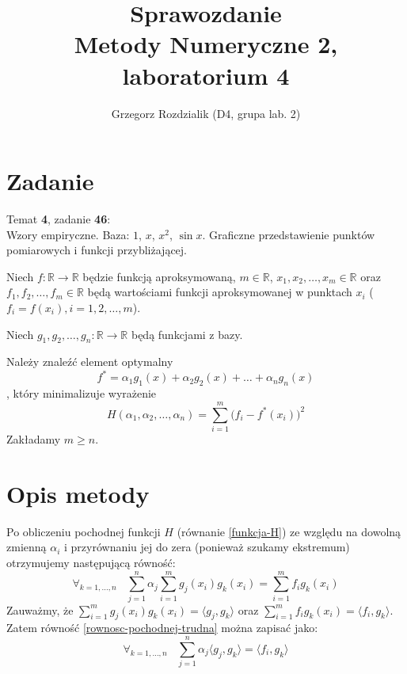 \documentclass[12pt]{article}
\begin{document}
	\title{Sprawozdanie\\Metody Numeryczne 2, laboratorium 4}
	\author{Grzegorz Rozdzialik (D4, grupa lab. 2)}
	\maketitle	
	
	\section{Zadanie}
	{\Large Temat \textbf{4}, zadanie \textbf{46}:}\\
	Wzory empiryczne. Baza: $1$, $x$, $x^2$, $\sin x$. Graficzne przedstawienie punktów pomiarowych i funkcji przybliżającej.
	
	Niech $f: \mathbb{R} \to \mathbb{R}$ będzie funkcją aproksymowaną,
	$m \in \mathbb{R}$,
	$x_1, x_2, \dots, x_m \in \mathbb{R}$
	oraz $f_1, f_2, \dots, f_m \in \mathbb{R}$ będą wartościami funkcji aproksymowanej w punktach $x_i$ ($f_i = f(x_i), i = 1, 2, \dots, m$).
	
	Niech $g_1, g_2, \dots, g_n: \mathbb{R} \to \mathbb{R}$ będą funkcjami z bazy.
	
	Należy znaleźć element optymalny
	\begin{equation}
	f^* = \alpha_1 g_1(x) + \alpha_2 g_2(x) + \dots + \alpha_n g_n(x) \label{element-optymalny}
	\end{equation},
	który minimalizuje wyrażenie
	\begin{equation}
	H(\alpha_1, \alpha_2, \dots, \alpha_n) = \sum_{i=1}^{m} \Big(f_i - f^*(x_i)\Big)^2
	\label{funkcja-H}
	\end{equation}
	Zakładamy $m \geq n$.
	
	
	\section{Opis metody}
	Po obliczeniu pochodnej funkcji $H$ (równanie \eqref{funkcja-H}) ze względu na dowolną zmienną $\alpha_i$ i przyrównaniu jej do zera (ponieważ szukamy ekstremum) otrzymujemy następującą równość:
	\begin{equation}
		\forall_{k = 1, \dots, n} \hspace{10pt}
		\sum_{j=1}^{n} \alpha_j \sum_{i=1}^{m} g_j(x_i) g_k(x_i) = \sum_{i=1}^{m} f_i g_k(x_i)
		\label{rownosc-pochodnej-trudna}
	\end{equation}
	Zauważmy, że $\sum_{i=1}^{m} g_j(x_i) g_k(x_i) = \langle g_j, g_k \rangle$ oraz 
	$\sum_{i=1}^{m} f_i g_k(x_i) = \langle f_i, g_k \rangle$. Zatem równość \eqref{rownosc-pochodnej-trudna} można zapisać jako:
	\begin{equation}
		\forall_{k = 1, \dots, n} \hspace{10pt}
		\sum_{j=1}^{n} \alpha_j \langle g_j, g_k \rangle = \langle f_i, g_k \rangle
		\label{rownosc-pochodnej-uproszczona}
	\end{equation}
	
\end{document}
